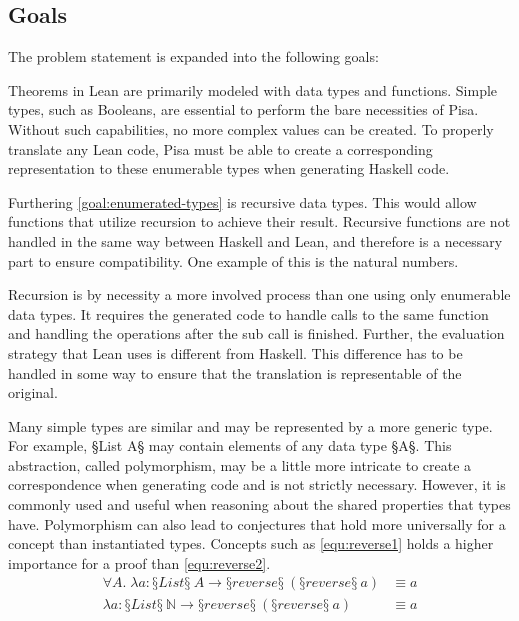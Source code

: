 \subsection{Goals}\label{sec:introduction:goals}
The problem statement is expanded into the following goals:

\label{goal:enumerated-types}
Theorems in Lean are primarily modeled with data types and functions.
Simple types, such as Booleans, are essential to perform the bare necessities of Pisa.
Without such capabilities, no more complex values can be created.
To properly translate any Lean code, Pisa must be able to create a corresponding representation to these enumerable types when generating Haskell code.

\label{goal:recursive-types}
Furthering \cref{goal:enumerated-types} is recursive data types.
This would allow functions that utilize recursion to achieve their result.
Recursive functions are not handled in the same way between Haskell and Lean, and therefore is a necessary part to ensure compatibility.
One example of this is the natural numbers.

Recursion is by necessity a more involved process than one using only enumerable data types.
It requires the generated code to handle calls to the same function and handling the operations after the sub call is finished.
Further, the evaluation strategy that Lean uses is different from Haskell.
This difference has to be handled in some way to ensure that the translation is representable of the original.

\label{goal:polymorphic-types}
Many simple types are similar and may be represented by a more generic type.
For example, §List A§ may contain elements of any data type §A§.
This abstraction, called polymorphism, may be a little more intricate to create a correspondence when generating code and is not strictly necessary.
However, it is commonly used and useful when reasoning about the shared properties that types have.
Polymorphism can also lead to conjectures that hold more universally for a concept than instantiated types.
Concepts such as \cref{equ:reverse1} holds a higher importance for a proof than \cref{equ:reverse2}.
\begin{align}
  ∀A.\; λa : §List§\ A → §reverse§\ (§reverse§\ a) &≡ a \label{equ:reverse1}\\
        λa : §List§\ ℕ → §reverse§\ (§reverse§\ a) &≡ a \label{equ:reverse2}
\end{align}


